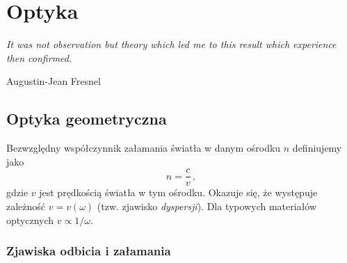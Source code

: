 \documentclass[../main.tex]{subfiles}
\begin{document}
\section{Optyka}
\textit{It was not observation but theory which led me to this result which experience then confirmed.}\begin{flushright}Augustin-Jean Fresnel\end{flushright}
\begin{center}
    \pgfspectra[width=10 cm, height=2cm, axis, axis color=white, axis font color=black]
\end{center}
\subsection{Optyka geometryczna}
Bezwzględny współczynnik załamania światła w danym ośrodku \(n\) definiujemy jako
\begin{equation*}
    n=\frac{c}{v}\,,
\end{equation*}
gdzie \(v\) jest prędkością światła w tym ośrodku. Okazuje się, że występuje zależność \(v=v(\omega)\) (tzw. zjawisko \textit{dyspersji}). Dla typowych materiałów optycznych \(v\propto1/\omega\).
\subsubsection{Zjawiska odbicia i załamania}
\noindent{}
\medskip

\noindent{}
\end{document}
